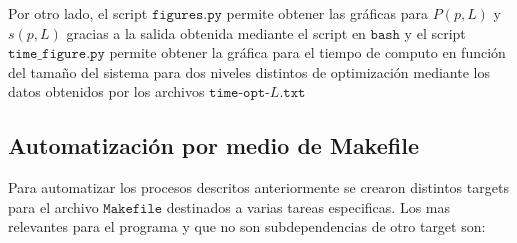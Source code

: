 \documentclass[12pt,a4paper]{article}
\begin{document}
Por otro lado, el script $\texttt{figures.py}$ permite obtener las gráficas para $P(p,L)$ y $s(p,L)$ gracias a la salida obtenida mediante el script en $\texttt{bash}$ y el script $\texttt{time\_figure.py}$ permite obtener la gráfica para el tiempo de computo en función del tamaño del sistema para dos niveles distintos de optimización mediante los datos obtenidos por los archivos $\texttt{time-opt-$L$.txt}$

\subsection{Automatización por medio de Makefile}
Para automatizar los procesos descritos anteriormente se crearon distintos targets para el archivo $\texttt{Makefile}$ destinados a varias tareas especificas. Los mas relevantes para el programa y que no son subdependencias de otro target son:
\end{document}
